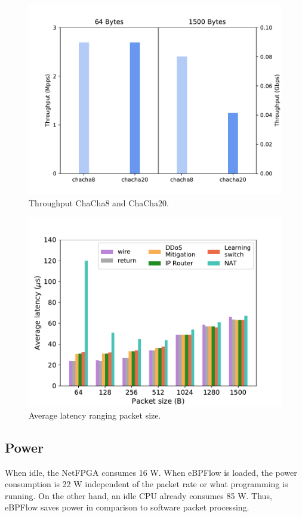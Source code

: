\begin{figure}[ht]
\centering
\includegraphics[width=1.\linewidth]{figures/throughput_chacha.pdf}
\caption{Throughput ChaCha8 and ChaCha20.}
\label{fig:latency}
\end{figure}


\begin{figure}[ht]
\centering
\includegraphics[width=1.\linewidth]{figures/latency.pdf}
\caption{Average latency ranging packet size.}
\label{fig:latency}
\end{figure}

\subsection{Power}

When idle, the NetFPGA consumes 16 W.
When eBPFlow is loaded, the power consumption is 22 W independent of the packet rate or what programming is running.
On the other hand, an idle CPU already consumes 85 W.
Thus, eBPFlow saves power in comparison to software packet processing.


